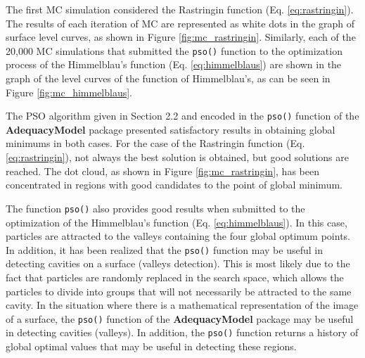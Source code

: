 \documentclass[10pt,letterpaper]{article}
\begin{document}
The first MC simulation considered the Rastringin function (Eq. \ref{eq:rastringin}). The results of each iteration of MC are represented as white dots in the graph of surface level curves, as shown in Figure \ref{fig:mc_rastringin}. Similarly, each of the 20,000 MC simulations that submitted the \texttt{pso()} function to the optimization process of the Himmelblau's function (Eq. \ref{eq:himmelblaus}) are shown in the graph of the level curves of the function of Himmelblau's, as can be seen in Figure \ref{fig:mc_himmelblaus}.

The PSO algorithm given in Section 2.2 and encoded in the \texttt{pso()} function of the \textbf{AdequacyModel} package presented satisfactory results in obtaining global minimums in both cases. For the case of the Rastringin function (Eq. \ref{eq:rastringin}), not always the best solution is obtained, but good solutions are reached. The dot cloud, as shown in Figure \ref{fig:mc_rastringin}, has been concentrated in regions with good candidates to the point of global minimum.

The function \texttt{pso()} also provides good results when submitted to the optimization of the Himmelblau's function (Eq. \ref{eq:himmelblaus}). In this case, particles are attracted to the valleys containing the four global optimum points. In addition, it has been realized that the \texttt{pso()} function may be useful in detecting cavities on a surface (valleys detection). This is most likely due to the fact that particles are randomly replaced in the search space, which allows the particles to divide into groups that will not necessarily be attracted to the same cavity. In the situation where there is a mathematical representation of the image of a surface, the \texttt{pso()} function of the \textbf{AdequacyModel} package may be useful in detecting cavities (valleys). In addition, the \texttt{pso()} function returns a history of global optimal values that may be useful in detecting these regions.
\end{document}
